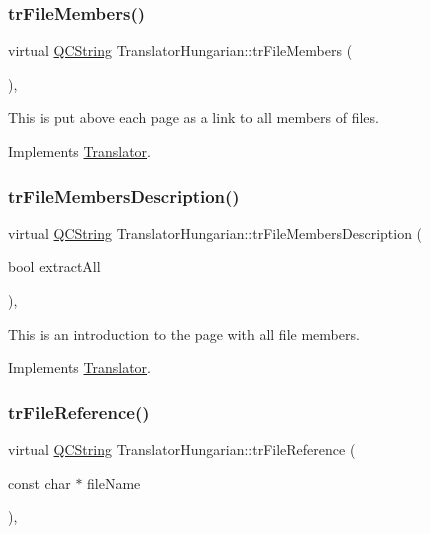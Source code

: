 \subsubsection{\texorpdfstring{trFileMembers()}{trFileMembers()}}
{\footnotesize\ttfamily virtual \mbox{\hyperlink{class_q_c_string}{Q\+C\+String}} Translator\+Hungarian\+::tr\+File\+Members (\begin{DoxyParamCaption}{ }\end{DoxyParamCaption})\hspace{0.3cm}{\ttfamily [inline]}, {\ttfamily [virtual]}}

This is put above each page as a link to all members of files. 

Implements \mbox{\hyperlink{class_translator}{Translator}}.

\mbox{\label{class_translator_hungarian_a6e524172127a2d092fb93bee639205e4}} 
\subsubsection{\texorpdfstring{trFileMembersDescription()}{trFileMembersDescription()}}
{\footnotesize\ttfamily virtual \mbox{\hyperlink{class_q_c_string}{Q\+C\+String}} Translator\+Hungarian\+::tr\+File\+Members\+Description (\begin{DoxyParamCaption}\item[{bool}]{extract\+All }\end{DoxyParamCaption})\hspace{0.3cm}{\ttfamily [inline]}, {\ttfamily [virtual]}}

This is an introduction to the page with all file members. 

Implements \mbox{\hyperlink{class_translator}{Translator}}.

\mbox{\label{class_translator_hungarian_a96c53cdda7fd040ad7537bb0dcbf87e6}} 
\subsubsection{\texorpdfstring{trFileReference()}{trFileReference()}}
{\footnotesize\ttfamily virtual \mbox{\hyperlink{class_q_c_string}{Q\+C\+String}} Translator\+Hungarian\+::tr\+File\+Reference (\begin{DoxyParamCaption}\item[{const char $\ast$}]{file\+Name }\end{DoxyParamCaption})\hspace{0.3cm}{\ttfamily [inline]}, {\ttfamily [virtual]}}


